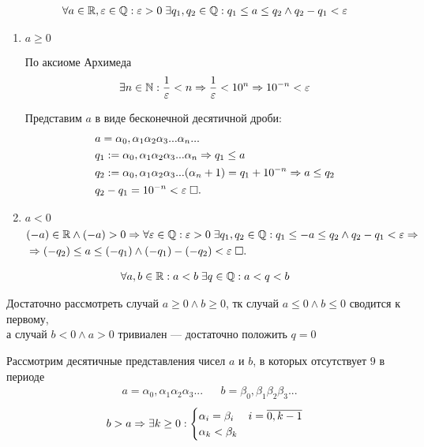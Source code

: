 \documentclass{article}
\begin{document}

\theorem
\begin{align*}
	\forall a\in\mathbb{R},\varepsilon\in\mathbb{Q}:\varepsilon>0\;\exists q_1,q_2\in\mathbb{Q}:q_1\leq a\leq q_2\land q_2-q_1<\varepsilon
\end{align*}

\proof
\begin{enumerate}
	\item{}$a\geq 0$

	По аксиоме Архимеда
	\begin{align*}
		\exists n\in\mathbb{N}:\frac{1}{\varepsilon}<n\Rightarrow \frac{1}{\varepsilon}<10^{n}\Rightarrow 10^{-n}<\varepsilon
	\end{align*}

	Представим $a$ в виде бесконечной десятичной дроби:
	\begin{align*}
		 & a=\alpha_0,\alpha_1\alpha_2\alpha_3...\alpha_{n}...                                \\
		 & q_1:=\alpha_0,\alpha_1\alpha_2\alpha_3...\alpha_{n}\Rightarrow q_1\leq a                 \\
		 & q_2:=\alpha_0,\alpha_1\alpha_2\alpha_3...(\alpha_{n}+1)=q_1+10^{-n}\Rightarrow a\leq q_2 \\
		 & q_2-q_1=10^{-n}<\varepsilon\;\square.
	\end{align*}

	\item{}$a<0$
	\begin{align*}
		 & (-a)\in\mathbb{R}\land (-a)>0\Rightarrow \forall\varepsilon\in\mathbb{Q}:\varepsilon>0\;\exists q_1,q_2\in\mathbb{Q}:q_1\leq -a\leq q_2\land q_2-q_1<\varepsilon\Rightarrow \\
		 & \Rightarrow (-q_2)\leq a\leq (-q_1)\land (-q_1)-(-q_2)<\varepsilon\;\square.
	\end{align*}
\end{enumerate}

\theorem
\begin{align*}
	\forall a,b\in\mathbb{R}:a<b\;\exists q\in\mathbb{Q}:a<q<b
\end{align*}

\proof

Достаточно рассмотреть случай $a \geq 0\land b \geq 0$, тк случай $a \leq 0\land b \leq 0$ сводится к первому,\\
а случай $b < 0\land a > 0$ тривиален — достаточно положить $q = 0$

Рассмотрим десятичные представления чисел $a$ и $b$, в которых отсутствует $9$ в периоде
\begin{align*}
	 & a=\alpha_0,\alpha_1\alpha_2\alpha_3... &  & b=\beta_0,\beta_1\beta_2\beta_3...
\end{align*}
\begin{align*}
	b>a\Rightarrow\exists k\geq 0:
	\begin{cases}
		\alpha_{i}=\beta_{i} & i=\overline{0,k-1} \\
		\alpha_{k}<\beta_{k}
	\end{cases}
\end{align*}
\end{document}
